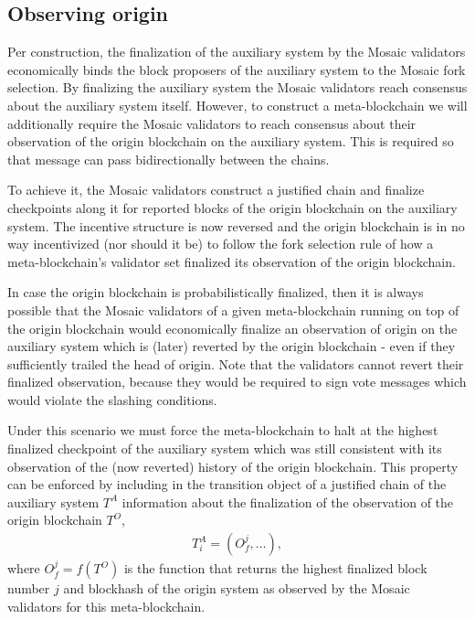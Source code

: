 \documentclass[12pt,a4paper]{article}
\begin{document}
\subsection{Observing origin}
\label{observing_origin}

Per construction, the finalization of the auxiliary system by the Mosaic validators economically binds the block proposers of the auxiliary system to the Mosaic fork selection.
By finalizing the auxiliary system the Mosaic validators reach consensus about the auxiliary system itself.
However, to construct a meta-blockchain we will additionally require the Mosaic validators to reach consensus about their observation of the origin blockchain on the auxiliary system.
This is required so that message can pass bidirectionally between the chains.

To achieve it, the Mosaic validators construct a justified chain and finalize checkpoints along it for reported blocks of the origin blockchain on the auxiliary system.
The incentive structure is now reversed and the origin blockchain is in no way incentivized (nor should it be) to follow the fork selection rule of how a meta-blockchain's validator set finalized its observation of the origin blockchain.

In case the origin blockchain is probabilistically finalized, then it is always possible that the Mosaic validators of a given meta-blockchain running on top of the origin blockchain would economically finalize an observation of origin on the auxiliary system which is (later) reverted by the origin blockchain - even if they sufficiently trailed the head of origin.
Note that the validators cannot revert their finalized observation, because they would be required to sign vote messages which would violate the slashing conditions.

Under this scenario we must force the meta-blockchain to halt at the highest finalized checkpoint of the auxiliary system which was still consistent with its observation of the (now reverted) history of the origin blockchain.
This property can be enforced by including in the transition object of a justified chain of the auxiliary system $T^A$ information about the finalization of the observation of the origin blockchain $T^O$,
\begin{align*}
  T^A_i = (O^j_f, \dots),
\end{align*}
where $O^j_f = f(T^O)$ is the function that returns the highest finalized block number $j$ and blockhash of the origin system as observed by the Mosaic validators for this meta-blockchain.
\end{document}
